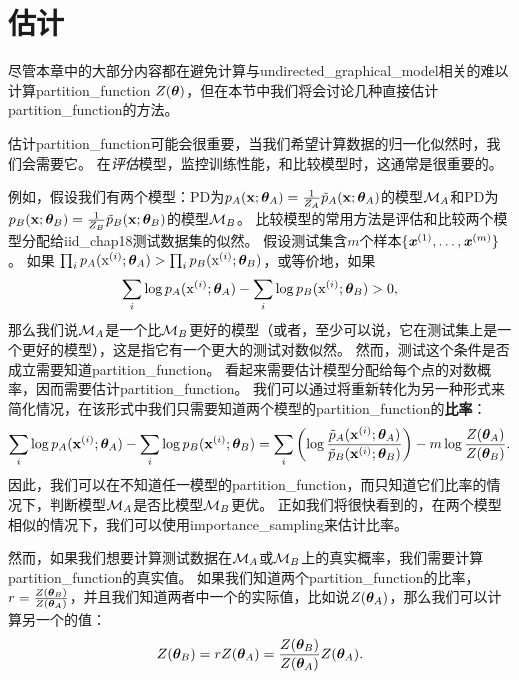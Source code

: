 \section{估计}
\label{sec:estimating_the_partition_function}
尽管本章中的大部分内容都在避免计算与\gls{undirected_graphical_model}相关的难以计算\gls{partition_function} $Z(\boldsymbol{\theta})$，但在本节中我们将会讨论几种直接估计\gls{partition_function}的方法。


估计\gls{partition_function}可能会很重要，当我们希望计算数据的归一化似然时，我们会需要它。
在\emph{评估}模型，监控训练性能，和比较模型时，这通常是很重要的。


例如，假设我们有两个模型：\gls{PD}为$p_A(\mathbf{x}; \boldsymbol{\theta}_A)= \frac{1}{Z_A} \tilde{p}_A(\mathbf{x}; \boldsymbol{\theta}_A)$的模型$\mathcal{M}_A$和\gls{PD}为$p_B(\mathbf{x}; \boldsymbol{\theta}_B)= \frac{1}{Z_B} \tilde{p}_B(\mathbf{x}; \boldsymbol{\theta}_B)$的模型$\mathcal{M}_B$。
比较模型的常用方法是评估和比较两个模型分配给\gls{iid_chap18}测试数据集的似然。
假设测试集含$m$个样本$\{ \boldsymbol{\mathit{x}}^{(1)}, \dots, \boldsymbol{\mathit{x}}^{(m)} \}$。
如果 $\prod_i p_A ( \mathrm{x}^{(i)}; \boldsymbol{\theta}_A) > \prod_i p_B( \mathrm{x}^{(i)}; \boldsymbol{\theta}_B)$，或等价地，如果
\begin{equation}
\label{eq:18.38}
	\sum_i \log p_A (\mathrm{x}^{(i)}; \boldsymbol{\theta}_A) - \sum_i \log p_B(\mathrm{x}^{(i)}; \boldsymbol{\theta}_B) > 0,
\end{equation}
那么我们说$\mathcal{M}_A$是一个比$\mathcal{M}_B$更好的模型（或者，至少可以说，它在测试集上是一个更好的模型），这是指它有一个更大的测试对数似然。
然而，测试这个条件是否成立需要知道\gls{partition_function}。
看起来需要估计模型分配给每个点的对数概率，因而需要估计\gls{partition_function}。
我们可以通过将重新转化为另一种形式来简化情况，在该形式中我们只需要知道两个模型的\gls{partition_function}的\textbf{比率}：
\begin{equation}
\label{eq:18.39}
	\sum_i \log p_A(\mathbf{x}^{(i)}; \boldsymbol{\theta}_A) - \sum_i \log p_B(\mathbf{x}^{(i)}; \boldsymbol{\theta}_B) =
	\sum_i \left(  \log \frac{ \tilde{p}_A(\mathbf{x}^{(i)}; \boldsymbol{\theta}_A) }{ \tilde{p}_B(\mathbf{x}^{(i)}; \boldsymbol{\theta}_B) } \right)  - m\log \frac{Z(\boldsymbol{\theta}_A)}{ Z(\boldsymbol{\theta}_B) }.
\end{equation}
因此，我们可以在不知道任一模型的\gls{partition_function}，而只知道它们比率的情况下，判断模型$\mathcal{M}_A$是否比模型$\mathcal{M}_B$更优。
正如我们将很快看到的，在两个模型相似的情况下，我们可以使用\gls{importance_sampling}来估计比率。


然而，如果我们想要计算测试数据在$\mathcal{M}_A$或$\mathcal{M}_B$上的真实概率，我们需要计算\gls{partition_function}的真实值。
如果我们知道两个\gls{partition_function}的比率，$r = \frac{Z(\boldsymbol{\theta}_B)}{ Z(\boldsymbol{\theta}_A) }$，并且我们知道两者中一个的实际值，比如说$Z(\boldsymbol{\theta}_A)$，那么我们可以计算另一个的值：
\begin{equation}
	Z(\boldsymbol{\theta}_B) = r Z(\boldsymbol{\theta}_A) = \frac{ Z(\boldsymbol{\theta}_B) }{ Z(\boldsymbol{\theta}_A) } Z(\boldsymbol{\theta}_A).
\end{equation}



